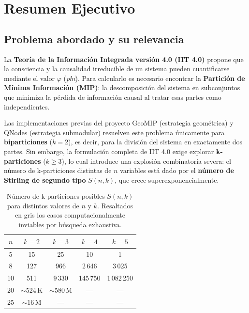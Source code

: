 
\section{Resumen Ejecutivo}

\subsection{Problema abordado y su relevancia}

La \textbf{Teoría de la Información Integrada versión 4.0 (IIT 4.0)} propone que la consciencia
y la causalidad irreducible de un sistema pueden cuantificarse mediante el valor $\varphi$
(\textit{phi}). Para calcularlo es necesario encontrar la \textbf{Partición de Mínima Información
(MIP)}: la descomposición del sistema en subconjuntos que minimiza la pérdida de información
causal al tratar esas partes como independientes.

Las implementaciones previas del proyecto GeoMIP (estrategia geométrica) y QNodes (estrategia
submodular) resuelven este problema únicamente para \textbf{biparticiones} ($k = 2$), es decir,
para la división del sistema en exactamente dos partes. Sin embargo, la formulación completa de
IIT 4.0 exige explorar \textbf{k-particiones} ($k \geq 3$), lo cual introduce una explosión
combinatoria severa: el número de k-particiones distintas de $n$ variables está dado por el
\textbf{número de Stirling de segundo tipo} $S(n, k)$, que crece superexponencialmente.

\begin{table}[H]
  \centering
  \caption{Número de k-particiones posibles $S(n,k)$ para distintos valores de $n$ y $k$.
           Resaltados en gris los casos computacionalmente inviables por búsqueda exhaustiva.}
  \label{tab:stirling}
  \begin{tabular}{ccccc}
    \toprule
    $n$ & $k=2$ & $k=3$ & $k=4$ & $k=5$ \\
    \midrule
    5  & 15        & 25        & 10            & 1          \\
    8  & 127       & 966       & 2\,646        & 3\,025     \\
    10 & 511       & 9\,330    & 145\,750      & 1\,082\,250 \\
    20 & $\sim$524\,K & $\sim$580\,M & \cellcolor{gray!20}--- & \cellcolor{gray!20}--- \\
    25 & $\sim$16\,M  & \cellcolor{gray!20}--- & \cellcolor{gray!20}--- & \cellcolor{gray!20}--- \\
    \bottomrule
  \end{tabular}
\end{table}


